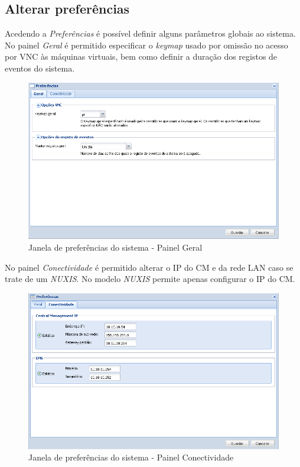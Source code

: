 \subsection{Alterar preferências}
Acedendo a \emph{Preferências} é possível definir alguns parâmetros globais ao sistema.
No painel \emph{Geral} é permitido especificar o \emph{keymap} usado por omissão no acesso por VNC às máquinas virtuais, bem como definir a duração dos registos de eventos do sistema.

\begin{figure}[H]
        \begin{center}
        \includegraphics[scale=0.5]{screenshots/preferences_general.png}
        \caption{Janela de preferências do sistema - Painel Geral}
        \label{fig:preferences_general}
        \end{center}
\end{figure}

No painel \emph{Conectividade} é permitido alterar o IP do CM e da rede LAN caso se trate de um \emph{NUXIS}. No modelo \emph{NUXIS} permite apenas configurar o IP do CM.

\begin{figure}[H]
        \begin{center}
        \includegraphics[scale=0.5]{screenshots/preferences_conn.png}
        \caption{Janela de preferências do sistema - Painel Conectividade}
        \label{fig:preferences_conn}
        \end{center}
\end{figure}


